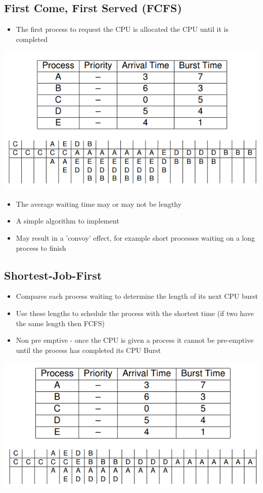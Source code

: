 \documentclass{article}[18pt]
\begin{document}
\subsection{First Come, First Served (FCFS)}
\begin{itemize}
\item The first process to request the CPU is allocated the CPU until it is completed
\end{itemize}
\begin{center}
\includegraphics[scale=0.7]{FCFS}
\end{center}
\begin{itemize}
\item The average waiting time may or may not be lengthy
\item A simple algorithm to implement
\item May result in a 'convoy' effect, for example short processes waiting on a long process to finish
\end{itemize}
\subsection{Shortest-Job-First}
\begin{itemize}
\item Compares each process waiting to determine the length of its next CPU burst
\item Use these lengths to schedule the process with the shortest time (if two have the same length then FCFS)
\item Non pre emptive - once the CPU is given a process it cannot be pre-emptive until the process has completed its CPU Burst
\end{itemize}
\begin{center}
\includegraphics[scale=0.7]{SJF}
\end{center}
\end{document}
